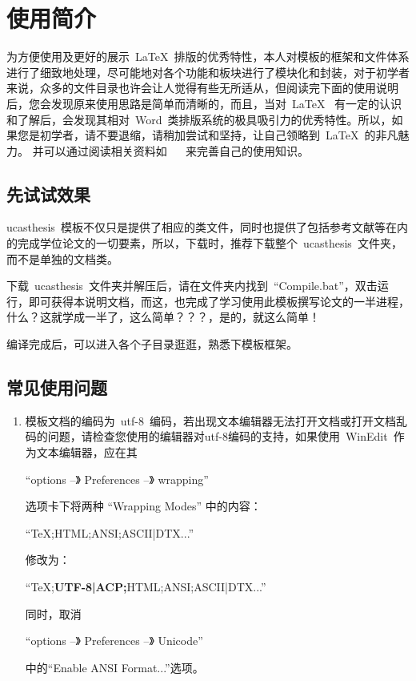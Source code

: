 
\chapter{使用简介}
\label{chap:guide}

为方便使用及更好的展示~\LaTeX{}~排版的优秀特性，本人对模板的框架和文件体系进行了细致地处理，尽可能地对各个功能和板块进行了模块化和封装，对于初学者来说，众多的文件目录也许会让人觉得有些无所适从，但阅读完下面的使用说明后，您会发现原来使用思路是简单而清晰的，而且，当对~\LaTeX{}~ 有一定的认识和了解后，会发现其相对~Word~类排版系统的极具吸引力的优秀特性。所以，如果您是初学者，请不要退缩，请稍加尝试和坚持，让自己领略到~\LaTeX{}~的非凡魅力。 并可以通过阅读相关资料如~ \citep{wikibook2014latex}~ 来完善自己的使用知识。

\section{先试试效果}

ucasthesis~模板不仅只是提供了相应的类文件，同时也提供了包括参考文献等在内的完成学位论文的一切要素，所以，下载时，推荐下载整个~ucasthesis~文件夹，而不是单独的文档类。

下载~ucasthesis~文件夹并解压后，请在文件夹内找到~“Compile.bat”，双击运行，即可获得本说明文档，而这，也完成了学习使用此模板撰写论文的一半进程，什么？这就学成一半了，这么简单？？？，是的，就这么简单！

编译完成后，可以进入各个子目录逛逛，熟悉下模板框架。

\section{常见使用问题}

\begin{enumerate}
  \item 模板文档的编码为~utf-8~编码，若出现文本编辑器无法打开文档或打开文档乱码的问题，请检查您使用的编辑器对utf-8编码的支持，如果使用~WinEdit~作为文本编辑器，应在其

  “options --》 Preferences --》 wrapping”

  选项卡下将两种 “Wrapping Modes” 中的内容：

  “TeX;HTML;ANSI;ASCII|DTX...”

  修改为：

  “TeX;\textbf{UTF-8|ACP;}HTML;ANSI;ASCII|DTX...”

  同时，取消

  “options --》 Preferences --》 Unicode”

  中的“Enable ANSI Format...”选项。
\end{enumerate}


